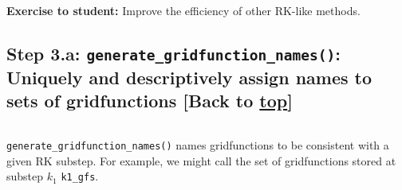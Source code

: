 \documentclass[landscape,letterpaper,10pt,english]{article}
\begin{document}
\textbf{Exercise to student:} Improve the efficiency of other RK-like
methods.

    \hypertarget{step-3.a-generate_gridfunction_names-uniquely-and-descriptively-assign-names-to-sets-of-gridfunctions-back-to-top}{%
\subsection{\texorpdfstring{Step 3.a:
\texttt{generate\_gridfunction\_names()}: Uniquely and descriptively
assign names to sets of gridfunctions {[}Back to
\hyperref[toc]{top}{]}}{Step 3.a: generate\_gridfunction\_names(): Uniquely and descriptively assign names to sets of gridfunctions {[}Back to {]}}}\label{step-3.a-generate_gridfunction_names-uniquely-and-descriptively-assign-names-to-sets-of-gridfunctions-back-to-top}}

\[\label{generategfnames}\]

\texttt{generate\_gridfunction\_names()} names gridfunctions to be
consistent with a given RK substep. For example, we might call the set
of gridfunctions stored at substep \(k_1\) \texttt{k1\_gfs}.
\end{document}
